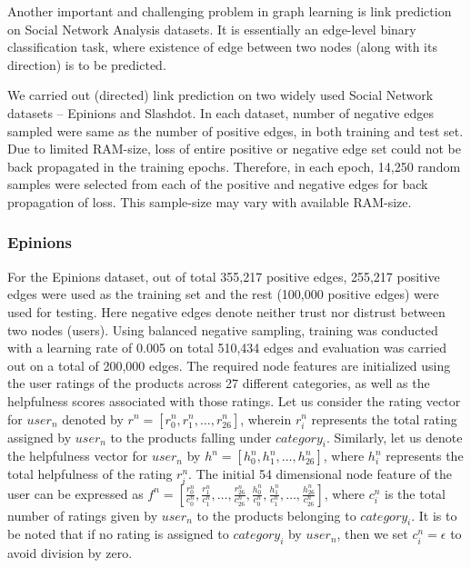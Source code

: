 Another important and challenging problem in graph learning is link prediction on Social Network Analysis datasets. It is essentially an edge-level binary classification task, where existence of edge between two nodes (along with its direction) is to be predicted.

We carried out (directed) link prediction on two widely used Social Network datasets -- Epinions and Slashdot.
In each dataset, number of negative edges sampled were same as the number of positive edges, in both training and test set. Due to limited RAM-size, loss of entire positive or negative edge set could not be back propagated in the training epochs. Therefore, in each epoch, 14,250 random samples were selected from each of the positive and negative edges for back propagation of loss. This sample-size may vary with available RAM-size. 
\subsubsection{Epinions}
\label{sec:epns}
For the Epinions  dataset,
out of total 355,217 positive edges, 255,217 positive edges were used as the training set and the rest (100,000 positive edges) were used for testing. Here negative edges denote neither trust nor distrust between two nodes (users). %
Using balanced negative sampling, training was conducted with a learning rate of 0.005 on total 510,434 edges and evaluation was carried out on a total of 200,000 edges. The required node features are initialized using the user ratings of the products across 27 different categories, as well as the helpfulness scores associated with those ratings. Let us consider the rating vector for $user_n$ denoted by $r^n=[r_0^n, r_1^n, \dots , r_{26}^n]$, wherein $r_i^n$ represents the total rating assigned by $user_n$ to the products falling under $category_i$. Similarly, let us denote the helpfulness vector for $user_n$ by $h^n=[h_0^n, h_1^n, \dots , h_{26}^n]$, where $h_i^n$ represents the total helpfulness of the rating $r_i^n$. The initial 54 dimensional node feature of the user can be expressed as $f^n=[\frac{r_0^n}{c_0^n}, \frac{r_1^n}{c_1^n}, \dots , \frac{r_{26}^n}{c_{26}^n}, \frac{h_0^n}{c_0^n}, \frac{h_1^n}{c_1^n}, \dots , \frac{h_{26}^n}{c_{26}^n}]$, where $c_i^n$ is the total number of ratings given by $user_n$ to the products belonging to $category_i$. It is to be noted that if no rating is assigned to $category_i$ by $user_n$, then we set $c_i^n=\epsilon$ to avoid division by zero.
